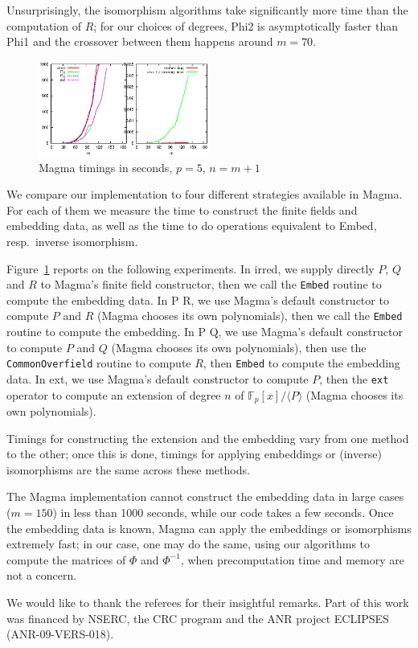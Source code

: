 \documentclass{sig-alternate}
\def\F {\ensuremath{\mathbb{F}}}
\newcounter{algo}
\newcommand{\ang}[1]{\langle#1\rangle}
\begin{document}
Unsurprisingly, the isomorphism algorithms take significantly more
time than the computation of $R$; for our choices of degrees, {\sf
  Phi2} is asymptotically faster than {\sf Phi1} and the crossover
between them happens around $m=70$. 

\begin{figure}
  \centering
  \includegraphics[width=0.5\textwidth]{magma}
  \vspace{-6ex}
\caption{Magma timings in seconds, $p=5$, $n=m+1$}
  \label{fig:magma}
\vspace{-4ex}
\end{figure}

We compare our implementation to four different strategies available
in Magma. For each of them we measure the time to construct the finite
fields and embedding data, as well as the time to do operations
equivalent to {\sf Embed}, resp.\ inverse
isomorphism. 

Figure~\ref{fig:magma} reports on the following experiments.
In {\sf irred}, we supply directly $P$, $Q$ and $R$ to Magma's
  finite field constructor, then we call the \verb+Embed+ routine to
  compute the embedding data.
 In  {\sf P R}, we use Magma's default constructor to compute $P$
  and $R$ (Magma chooses its own polynomials), then we call the
  \verb+Embed+ routine to compute the embedding.
 In {\sf P Q}, we use Magma's default constructor to compute $P$
  and $Q$ (Magma chooses its own polynomials), then use the
  \verb+CommonOverfield+ routine to compute $R$, then \verb+Embed+ to
  compute the embedding data.
 In {\sf ext}, we use Magma's default constructor to compute $P$,
  then the \verb+ext+ operator to compute an extension of degree $n$
  of $\F_p[x]/\ang{P}$ (Magma chooses its own polynomials).


Timings for constructing the extension and the embedding vary from one
method to the other; once this is done, timings for applying
embeddings or (inverse) isomorphisms are the same across these
methods.

The Magma implementation cannot construct the embedding data in large
cases ($m = 150$) in less than 1000 seconds, while our code takes a
few seconds. Once the embedding data is known, Magma can apply the
embeddings or isomorphisms extremely fast; in our case, one may do the
same, using our algorithms to compute the matrices of $\Phi$ and
$\Phi^{-1}$, when precomputation time and memory are not a concern.

{} We would like to thank the referees
for their insightful remarks. Part of this work was financed by NSERC,
the CRC program and the ANR project ECLIPSES (ANR-09-VERS-018).

\scriptsize
 
\end{document}
